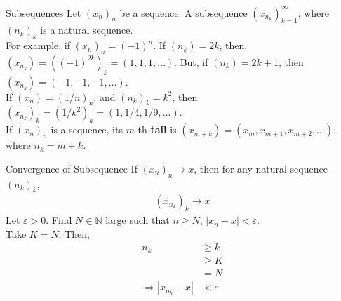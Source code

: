 \documentclass[8pt]{extarticle}
\newcommand{\N}{\mathbb{N}}
\begin{document}
  \begin{problem}{Subsequences}
    Let $(x_n)_n$ be a sequence. A subsequence $(x_{n_k})_{k=1}^{\infty}$, where $(n_k)_{k}$ is a natural sequence.\\

    For example, if $(x_n)_n = (-1)^n$. If $(n_k) = 2k$, then, $(x_{n_k}) = \left((-1)^{2k}\right)_k = (1,1,1,\dots)$. But, if $(n_k) = 2k+1$, then $(x_{n_k}) = (-1,-1,-1,\dots)$.\\

    If $(x_n) = (1/n)_n$, and $(n_k)_k = k^2$, then $(x_{n_k})_{k} = (1/k^2)_{k} = (1,1/4,1/9,\dots)$.\\

    If $(x_n)_n$ is a sequence, its $m$-th \textbf{tail} is $(x_{m+k}) = (x_m,x_{m+1},x_{m+2},\dots)$, where $n_k = m+k$.
  \end{problem}
  \begin{problem}{Convergence of Subsequence}
    If $(x_n)_n \rightarrow x$, then for any natural sequence $(n_k)_k$,
    \begin{align*}
      \left(x_{n_k}\right)_k \rightarrow x
    \end{align*}
    \tcblower
    Let $\varepsilon > 0$. Find $N\in\N$ large such that $n \geq N$, $|x_{n} - x| < \varepsilon$.\\

    Take $K = N$. Then,
    \begin{align*}
      n_k &\geq k\\
      &\geq K\\
      &= N\\
      \Rightarrow |x_{n_k} - x| &< \varepsilon
    \end{align*}
  \end{problem}
\end{document}
